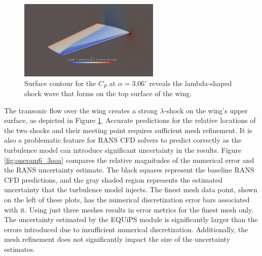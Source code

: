 \begin{figure}
\center
\includegraphics[width=0.6\textwidth]{code/image_gen/oneram6/images/oneram6_cp_contour.png}
\caption{Surface contour for the $C_P$ at $\alpha= 3.06^\circ$ reveals the lambda-shaped shock wave that forms on the top surface of the wing. \label{fig:oneram6_cp}}
\end{figure}

The transonic flow over the wing creates a strong $\lambda$-shock on the wing's upper surface, as depicted in Figure \ref{fig:oneram6_cp}.
Accurate predictions for the relative locations of the two shocks and their meeting point requires sufficient mesh refinement. 
It is also a problematic feature for RANS CFD solvers to predict correctly as the turbulence model can introduce significant uncertainty in the results.
Figure \ref{fig:oneram6_3aoa} compares the relative magnitudes of the numerical error and the RANS uncertainty estimate.
The black squares represent the baseline RANS CFD predictions, and the gray shaded region represents the estimated uncertainty that the turbulence model injects. 
The finest mesh data point, shown on the left of these plots, has the numerical discretization error bars associated with it. 
Using just three meshes results in error metrics for the finest mesh only.
The uncertainty estimated by the EQUiPS module is significantly larger than the errors introduced due to insufficient numerical discretization.
Additionally, the mesh refinement does not significantly impact the size of the uncertainty estimates. 


